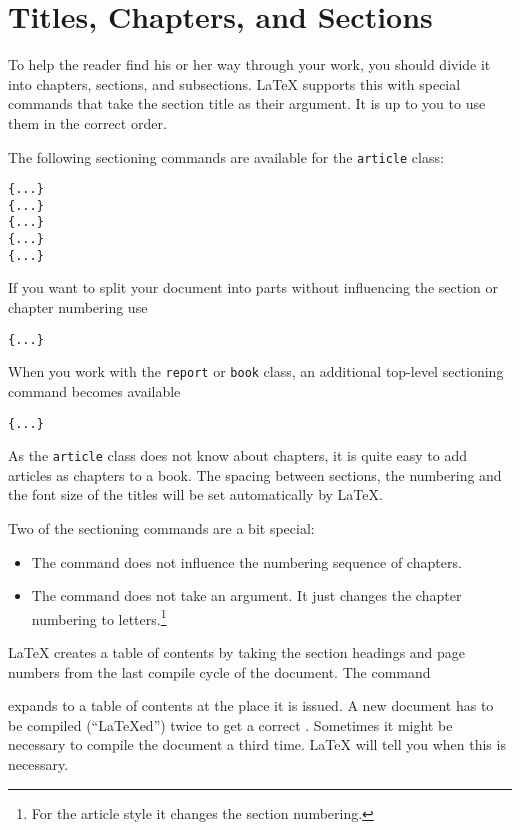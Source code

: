 \section{Titles, Chapters, and Sections}

To help the reader find his or her way through your work, you should
divide it into chapters, sections, and subsections.  \LaTeX{} supports
this with special commands that take the section title as their
argument.  It is up to you to use them in the correct order.

The following sectioning commands are available for the
\texttt{article} class: \nopagebreak

\begin{lscommand}
\verb|{...}|\\
\verb|{...}|\\
\verb|{...}|\\
\verb|{...}|\\
\verb|{...}|
\end{lscommand}

If you want to split your document into parts without influencing the
section or chapter numbering use
\begin{lscommand}
\verb|{...}|
\end{lscommand}

When you work with the \texttt{report} or \texttt{book} class,
an additional top-level sectioning command becomes available
\begin{lscommand}
\verb|{...}|
\end{lscommand}

As the \texttt{article} class does not know about chapters, it is quite easy
to add articles as chapters to a book.
The spacing between sections, the numbering and the font size of the
titles will be set automatically by \LaTeX.

Two of the sectioning commands are a bit special:
\begin{itemize}
\item The  command does
  not influence the numbering sequence of chapters.
\item The  command does not take an argument. It just
  changes the chapter numbering to letters.\footnote{For the article
    style it changes the section numbering.}
\end{itemize}

\LaTeX{} creates a table of contents by taking the section headings
and page numbers from the last compile cycle of the document. The command
\begin{lscommand}
\end{lscommand}
\noindent expands to a table of contents at the place it
is issued. A new
document has to be compiled (``\LaTeX ed'') twice to get a
correct . Sometimes it might be
necessary to compile the document a third time. \LaTeX{} will tell you
when this is necessary.

